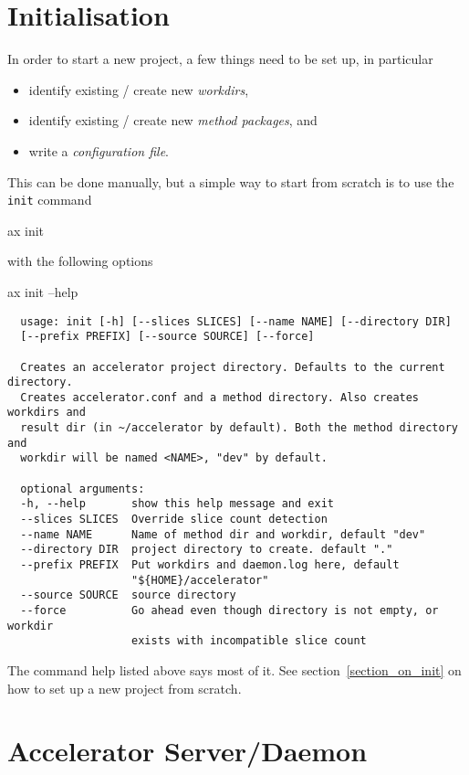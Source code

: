 \section{Initialisation}
In order to start a new project, a few things need to be set up, in
particular
\begin{itemize}
\item[] identify existing / create new \textsl{workdirs},
\item[] identify existing / create new \textsl{method packages}, and
\item[] write a \textsl{configuration file}.
\end{itemize}
This can be done manually, but a simple way to start from scratch is
to use the \texttt{init} command
\begin{shell}
  ax init
\end{shell}
with the following options
\begin{shell}
  ax init --help
\end{shell}
\begin{snugshade}
\begin{verbatim}
  usage: init [-h] [--slices SLICES] [--name NAME] [--directory DIR]
  [--prefix PREFIX] [--source SOURCE] [--force]

  Creates an accelerator project directory. Defaults to the current directory.
  Creates accelerator.conf and a method directory. Also creates workdirs and
  result dir (in ~/accelerator by default). Both the method directory and
  workdir will be named <NAME>, "dev" by default.

  optional arguments:
  -h, --help       show this help message and exit
  --slices SLICES  Override slice count detection
  --name NAME      Name of method dir and workdir, default "dev"
  --directory DIR  project directory to create. default "."
  --prefix PREFIX  Put workdirs and daemon.log here, default
                   "${HOME}/accelerator"
  --source SOURCE  source directory
  --force          Go ahead even though directory is not empty, or workdir
                   exists with incompatible slice count
\end{verbatim}
\end{snugshade}
The command help listed above says most of it.  See
section~\ref{section_on_init} on how to set up a new project from
scratch.




\section{Accelerator Server/Daemon}

